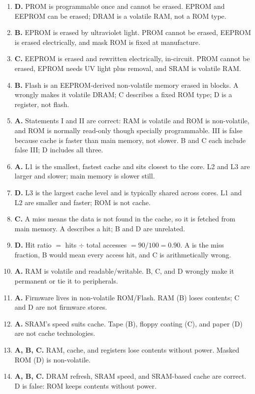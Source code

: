 \documentclass[11pt]{article}
\begin{document}
\begin{enumerate}[label=\textbf{Q\arabic*.}, leftmargin=*]
\item \textbf{D.} PROM is programmable once and cannot be erased. EPROM and
  EEPROM can be erased; DRAM is a volatile RAM, not a ROM type.
\item \textbf{B.} EPROM is erased by ultraviolet light. PROM cannot be
  erased, EEPROM is erased electrically, and mask ROM is fixed at
  manufacture.
\item \textbf{C.} EEPROM is erased and rewritten electrically, in-circuit.
  PROM cannot be erased, EPROM needs UV light plus removal, and SRAM is
  volatile RAM.
\item \textbf{B.} Flash is an EEPROM-derived non-volatile memory erased in
  blocks. A wrongly makes it volatile DRAM; C describes a fixed ROM type; D
  is a register, not flash.
\item \textbf{A.} Statements I and II are correct: RAM is volatile and ROM
  is non-volatile, and ROM is normally read-only though specially
  programmable. III is false because cache is faster than main memory, not
  slower. B and C each include false III; D includes all three.
\item \textbf{A.} L1 is the smallest, fastest cache and sits closest to the
  core. L2 and L3 are larger and slower; main memory is slower still.
\item \textbf{D.} L3 is the largest cache level and is typically shared
  across cores. L1 and L2 are smaller and faster; ROM is not cache.
\item \textbf{C.} A miss means the data is not found in the cache, so it is
  fetched from main memory. A describes a hit; B and D are unrelated.
\item \textbf{D.} Hit ratio $=$ hits $\div$ total accesses $= 90/100 = 0.90$.
  A is the miss fraction, B would mean every access hit, and C is
  arithmetically wrong.

\item \textbf{A.} RAM is volatile and readable/writable. B, C, and D wrongly make it permanent or tie it to peripherals.
\item \textbf{A.} Firmware lives in non-volatile ROM/Flash. RAM (B) loses contents; C and D are not firmware stores.
\item \textbf{A.} SRAM's speed suits cache. Tape (B), floppy coating (C), and paper (D) are not cache technologies.
\item \textbf{A, B, C.} RAM, cache, and registers lose contents without power. Masked ROM (D) is non-volatile.
\item \textbf{A, B, C.} DRAM refresh, SRAM speed, and SRAM-based cache are correct. D is false: ROM keeps contents without power.
\end{enumerate}
\def\JKSSBLessonID{8}\def\JKSSBAnswers{1}
\end{document}
